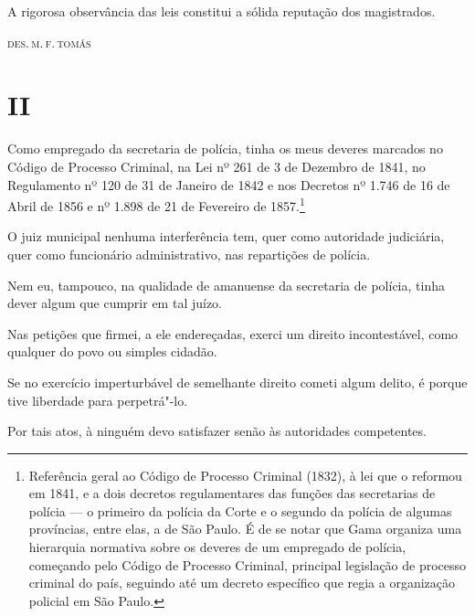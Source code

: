 \epigraph{A rigorosa observância das leis constitui a sólida reputação dos
magistrados.}{\textsc{des.\,m.\,f.\,tomás}\footnotemark}

\section*{II}

\noindent{}Como empregado da secretaria de polícia, tinha os meus deveres marcados
no Código de Processo Criminal, na Lei nº 261 de 3 de Dezembro de 1841,
no Regulamento nº 120 de 31 de Janeiro de 1842 e nos Decretos nº 1.746
de 16 de Abril de 1856 e nº 1.898 de 21 de Fevereiro de 1857.\footnote{
  Referência geral ao Código de Processo Criminal (1832), à lei que o
  reformou em 1841, e a dois decretos regulamentares das funções das
  secretarias de polícia --- o primeiro da polícia da Corte e o segundo da
  polícia de algumas províncias, entre elas, a de São Paulo. É de se
  notar que Gama organiza uma hierarquia normativa sobre os deveres de
  um empregado de polícia, começando pelo Código de Processo Criminal,
  principal legislação de processo criminal do país, seguindo até um
  decreto específico que regia a organização policial em São Paulo.}


O juiz municipal nenhuma interferência tem, quer como autoridade
judiciária, quer como funcionário administrativo, nas repartições de
polícia.

Nem eu, tampouco, na qualidade de amanuense da secretaria de polícia,
tinha dever algum que cumprir em tal juízo.

Nas petições que firmei, a ele endereçadas, exerci um direito
incontestável, como qualquer do povo ou simples cidadão.

Se no exercício imperturbável de semelhante direito cometi algum delito,
é porque tive liberdade para perpetrá"-lo.

Por tais atos, à ninguém devo satisfazer senão às autoridades
competentes.

